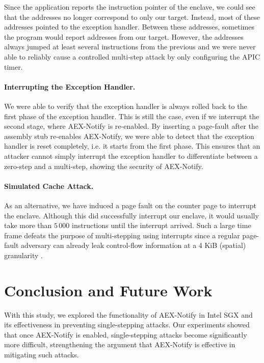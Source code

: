 \documentclass{llncs}
\begin{document}
Since the application reports the instruction pointer of the enclave,
we could see that the addresses no longer correspond to only our target.
Instead, most of these addresses pointed to the exception handler.
Between these addresses, sometimes the program would report addresses from our target.
However, the addresses always jumped at least several instructions from the previous
and we were never able to reliably cause a controlled multi-step attack
by only configuring the APIC timer.

\paragraph{Interrupting the Exception Handler.}
We were able to verify that the exception handler is always rolled back to the
first phase of the exception handler.
This is still the case, even if we interrupt the second stage, where AEX-Notify
is re-enabled.
By inserting a page-fault after the assembly stub re-enables AEX-Notify, we
were able to detect that the exception handler is reset completely, i.e. it
starts from the first phase.
This ensures that an attacker cannot simply interrupt the exception handler
to differentiate between a zero-step and a multi-step,
showing the security of AEX-Notify.

\paragraph{Simulated Cache Attack.}

As an alternative, we have induced a page fault on the counter page to
interrupt the enclave.
Although this did successfully interrupt our enclave, it would usually take
more than $5\,000$ instructions until the interrupt arrived.
Such a large time frame defeats the purpose of multi-stepping using interrupts
since a regular page-fault adversary can already leak control-flow information
at a 4 KiB (spatial) granularity \cite{TODO}.

\section{Conclusion and Future Work}

With this study, we explored the functionality of AEX-Notify in Intel SGX and
its effectiveness in preventing single-stepping attacks.
Our experiments showed that once AEX-Notify is enabled, single-stepping attacks
become significantly more difficult, strengthening the argument that AEX-Notify
is effective in mitigating such attacks.
\end{document}
